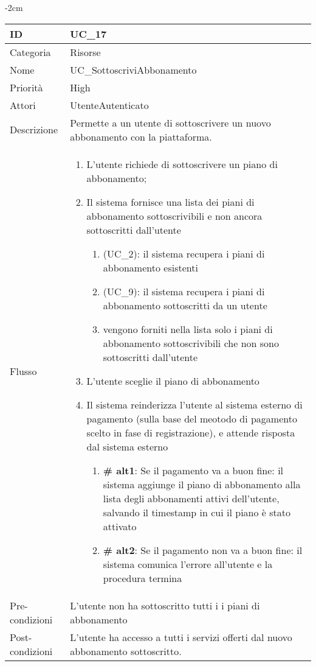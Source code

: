 \begin{center}
\begin{table}[bp]
    \centering
    \addtolength{\leftskip} {-2cm}
\begin{tabular}{ |p{2.6cm}|p{13cm}|  }
\hline
ID & UC\_17 \\\hline
Categoria & Risorse\\\hline
Nome & UC\_SottoscriviAbbonamento\\\hline
Priorità & High \\\hline
Attori &  UtenteAutenticato \\\hline
Descrizione & Permette a un utente di sottoscrivere un nuovo abbonamento con la piattaforma.\\\hline
Flusso &  	\vspace{-5mm} \begin{enumerate}
			\item L'utente richiede di sottoscrivere un piano di abbonamento;
			\item Il sistema fornisce una lista dei piani di abbonamento sottoscrivibili e non ancora sottoscritti dall'utente
				\begin{enumerate}[  ]
				\item (UC\_2): il sistema recupera i piani di abbonamento esistenti
				\item (UC\_9): il sistema recupera i piani di abbonamento sottoscritti da un utente
				\item vengono forniti nella lista solo i piani di abbonamento sottoscrivibili che non sono sottoscritti dall'utente
				\end{enumerate}
			\item L'utente sceglie il piano di abbonamento
			\item Il sistema reinderizza l'utente al sistema esterno di pagamento (sulla base del meotodo di pagamento scelto in fase di registrazione), e attende risposta dal sistema esterno
			\begin{enumerate}[  ]
				\item \textbf{\# alt1}: Se il pagamento va a buon fine: il sistema aggiunge il piano di abbonamento alla lista degli abbonamenti attivi dell'utente, salvando il timestamp in cui il piano è stato attivato
				\item \textbf{\# alt2}: Se il pagamento non va a buon fine: il sistema comunica l'errore all'utente e la procedura termina
			\end{enumerate}
		\end{enumerate}\\\hline
Pre-condizioni & L'utente non ha sottoscritto tutti i i piani di abbonamento\\\hline
Post-condizioni &  L'utente ha accesso a tutti i servizi offerti dal nuovo abbonamento sottoscritto.\\\hline
\end{tabular}
\label{table_use_case:17}\newline
\end{table}


\end{center}
